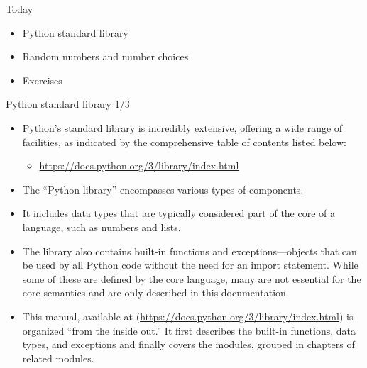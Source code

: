 \documentclass[
  8pt,
  ignorenonframetext,
]{beamer}
\providecommand{\tightlist}{%
  \setlength{\itemsep}{0pt}\setlength{\parskip}{0pt}}
\begin{document}
\begin{frame}{Today}
\protect\hypertarget{today}{}
\begin{itemize}
\item
  Python standard library
\item
  Random numbers and number choices
\item
  Exercises
\end{itemize}
\end{frame}

\begin{frame}{Python standard library 1/3}
\protect\hypertarget{python-standard-library-13}{}
\begin{itemize}[<+->]
\tightlist
\item
  Python's standard library is incredibly extensive, offering a wide
  range of facilities, as indicated by the comprehensive table of
  contents listed below:

  \begin{itemize}[<+->]
  \tightlist
  \item
    \url{https://docs.python.org/3/library/index.html}
  \end{itemize}
\end{itemize}

\begin{itemize}[<+->]
\tightlist
\item
  The ``Python library'' encompasses various types of components.
\end{itemize}

\begin{itemize}[<+->]
\tightlist
\item
  It includes data types that are typically considered part of the core
  of a language, such as numbers and lists.
\end{itemize}

\begin{itemize}[<+->]
\tightlist
\item
  The library also contains built-in functions and exceptions---objects
  that can be used by all Python code without the need for an import
  statement. While some of these are defined by the core language, many
  are not essential for the core semantics and are only described in
  this documentation.
\end{itemize}

\begin{itemize}[<+->]
\tightlist
\item
  This manual, available at
  (\url{https://docs.python.org/3/library/index.html}) is organized
  ``from the inside out.'' It first describes the built-in functions,
  data types, and exceptions and finally covers the modules, grouped in
  chapters of related modules.
\end{itemize}
\end{frame}
\end{document}
